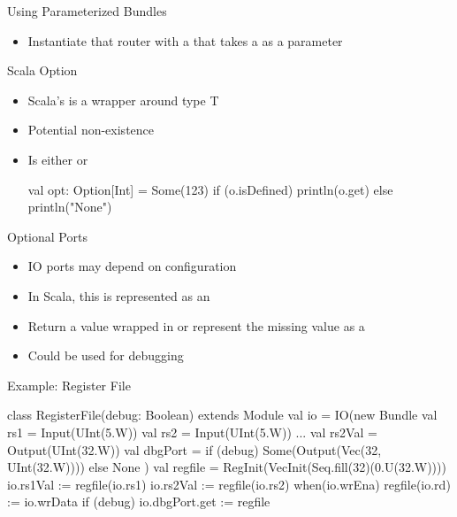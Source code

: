 \begin{frame}[fragile]{Using Parameterized Bundles}
\begin{itemize}
\item Instantiate that router with a  that takes
a  as a parameter
\end{itemize}
\end{frame}

\begin{frame}[fragile]{Scala Option}
\begin{itemize}
\item Scala's  is a wrapper around type T
\item Potential non-existence
\item Is either  or 
\begin{chisel}
val opt: Option[Int] = Some(123)
if (o.isDefined)
  println(o.get)
else
  println("None")
\end{chisel}
\end{itemize}
\end{frame}

\begin{frame}[fragile]{Optional Ports}
\begin{itemize}
\item IO ports may depend on configuration
\item In Scala, this is represented as an 
\item Return a value wrapped in  or represent the missing value
as a 
\item Could be used for debugging
\end{itemize}
\end{frame}

\begin{frame}[fragile]{Example: Register File}
\begin{chisel}
class RegisterFile(debug: Boolean) extends Module {
  val io = IO(new Bundle {
    val rs1 = Input(UInt(5.W))
    val rs2 = Input(UInt(5.W))
...
    val rs2Val = Output(UInt(32.W))
    val dbgPort = if (debug)
      Some(Output(Vec(32, UInt(32.W)))) else None
  })
  val regfile = RegInit(VecInit(Seq.fill(32)(0.U(32.W))))
  io.rs1Val := regfile(io.rs1)
  io.rs2Val := regfile(io.rs2)
  when(io.wrEna) {
    regfile(io.rd) := io.wrData
  }
  if (debug) {
    io.dbgPort.get := regfile
  }}
\end{chisel}
\end{frame}

